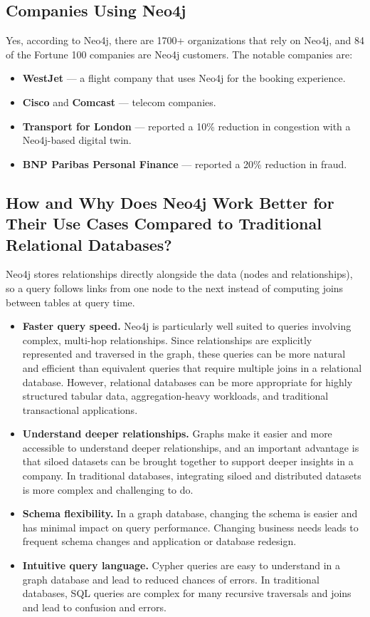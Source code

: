\documentclass[11pt,a4paper]{article}
\begin{document}
\subsection{Companies Using Neo4j}

Yes, according to Neo4j, there are 1700+ organizations that rely on Neo4j, and 84 of the Fortune 100 companies are Neo4j customers. The notable companies are:

\begin{itemize}
  \item \textbf{WestJet} --- a flight company that uses Neo4j for the booking experience.
  \item \textbf{Cisco} and \textbf{Comcast} --- telecom companies.
  \item \textbf{Transport for London} --- reported a 10\% reduction in congestion with a Neo4j-based digital twin.
  \item \textbf{BNP Paribas Personal Finance} --- reported a 20\% reduction in fraud.
\end{itemize}

\subsection{How and Why Does Neo4j Work Better for Their Use Cases Compared to Traditional Relational Databases?}

Neo4j stores relationships directly alongside the data (nodes and relationships), so a query follows links from one node to the next instead of computing joins between tables at query time.

\begin{itemize}
  \item \textbf{Faster query speed.} Neo4j is particularly well suited to queries involving complex, multi-hop relationships. Since relationships are explicitly represented and traversed in the graph, these queries can be more natural and efficient than equivalent queries that require multiple joins in a relational database. However, relational databases can be more appropriate for highly structured tabular data, aggregation-heavy workloads, and traditional transactional applications.
  \item \textbf{Understand deeper relationships.} Graphs make it easier and more accessible to understand deeper relationships, and an important advantage is that siloed datasets can be brought together to support deeper insights in a company. In traditional databases, integrating siloed and distributed datasets is more complex and challenging to do.
  \item \textbf{Schema flexibility.} In a graph database, changing the schema is easier and has minimal impact on query performance. Changing business needs leads to frequent schema changes and application or database redesign.
  \item \textbf{Intuitive query language.} Cypher queries are easy to understand in a graph database and lead to reduced chances of errors. In traditional databases, SQL queries are complex for many recursive traversals and joins and lead to confusion and errors.
\end{itemize}
\end{document}
